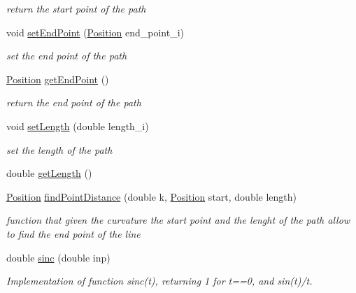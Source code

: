 \begin{DoxyCompactItemize}
\begin{DoxyCompactList}\small\item\em return the start point of the path \end{DoxyCompactList}\item 
void \mbox{\hyperlink{class_path2_d_1_1_element_1_1_line_a39675d1b58137465633f037aabfb57cc}{set\+End\+Point}} (\mbox{\hyperlink{class_path2_d_1_1_element_1_1_position}{Position}} end\+\_\+point\+\_\+i)
\begin{DoxyCompactList}\small\item\em set the end point of the path \end{DoxyCompactList}\item 
\mbox{\hyperlink{class_path2_d_1_1_element_1_1_position}{Position}} \mbox{\hyperlink{class_path2_d_1_1_element_1_1_line_ac0812b487cf344441073a9a49ee1b82d}{get\+End\+Point}} ()
\begin{DoxyCompactList}\small\item\em return the end point of the path \end{DoxyCompactList}\item 
void \mbox{\hyperlink{class_path2_d_1_1_element_1_1_line_ac18f28815c521092a2b1930647fae171}{set\+Length}} (double length\+\_\+i)
\begin{DoxyCompactList}\small\item\em set the length of the path \end{DoxyCompactList}\item 
double \mbox{\hyperlink{class_path2_d_1_1_element_1_1_line_a9f75579914f368af881348c298ecefb1}{get\+Length}} ()
\item 
\mbox{\hyperlink{class_path2_d_1_1_element_1_1_position}{Position}} \mbox{\hyperlink{class_path2_d_1_1_element_1_1_line_a375516699c55aee53a48ba9c3e819da8}{find\+Point\+Distance}} (double k, \mbox{\hyperlink{class_path2_d_1_1_element_1_1_position}{Position}} start, double length)
\begin{DoxyCompactList}\small\item\em function that given the curvature the start point and the lenght of the path allow to find the end point of the line \end{DoxyCompactList}\item 
double \mbox{\hyperlink{class_path2_d_1_1_element_1_1_line_a3ab3acf1cc03a38c0f9365edcf5088ab}{sinc}} (double inp)
\begin{DoxyCompactList}\small\item\em Implementation of function sinc(t), returning 1 for t==0, and sin(t)/t. \end{DoxyCompactList}\item 

\end{DoxyCompactItemize}
